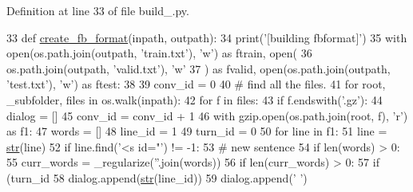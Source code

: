 Definition at line 33 of file build\+\_.\+py.


\begin{DoxyCode}
33 \textcolor{keyword}{def }\hyperlink{namespaceparlai_1_1tasks_1_1opensubtitles_1_1build__2009_ad149abe80311061e9b055102702633ed}{create\_fb\_format}(inpath, outpath):
34     print(\textcolor{stringliteral}{'[building fbformat]'})
35     with open(os.path.join(outpath, \textcolor{stringliteral}{'train.txt'}), \textcolor{stringliteral}{'w'}) \textcolor{keyword}{as} ftrain, open(
36         os.path.join(outpath, \textcolor{stringliteral}{'valid.txt'}), \textcolor{stringliteral}{'w'}
37     ) \textcolor{keyword}{as} fvalid, open(os.path.join(outpath, \textcolor{stringliteral}{'test.txt'}), \textcolor{stringliteral}{'w'}) \textcolor{keyword}{as} ftest:
38 
39         conv\_id = 0
40         \textcolor{comment}{# find all the files.}
41         \textcolor{keywordflow}{for} root, \_subfolder, files \textcolor{keywordflow}{in} os.walk(inpath):
42             \textcolor{keywordflow}{for} f \textcolor{keywordflow}{in} files:
43                 \textcolor{keywordflow}{if} f.endswith(\textcolor{stringliteral}{'.gz'}):
44                     dialog = []
45                     conv\_id = conv\_id + 1
46                     with gzip.open(os.path.join(root, f), \textcolor{stringliteral}{'r') as f1:}
47 \textcolor{stringliteral}{                        words = []}
48 \textcolor{stringliteral}{                        line\_id = 1}
49 \textcolor{stringliteral}{                        turn\_id = 0}
50 \textcolor{stringliteral}{                        }\textcolor{keywordflow}{for} line \textcolor{keywordflow}{in} f1:
51                             line = \hyperlink{namespacegenerate__task__READMEs_a5b88452ffb87b78c8c85ececebafc09f}{str}(line)
52                             \textcolor{keywordflow}{if} line.find(\textcolor{stringliteral}{'<s id="'}) != -1:
53                                 \textcolor{comment}{# new sentence}
54                                 \textcolor{keywordflow}{if} len(words) > 0:
55                                     curr\_words = \_regularize(\textcolor{stringliteral}{''}.join(words))
56                                     \textcolor{keywordflow}{if} len(curr\_words) > 0:
57                                         \textcolor{keywordflow}{if} (turn\_id %
58                                             dialog.append(\hyperlink{namespacegenerate__task__READMEs_a5b88452ffb87b78c8c85ececebafc09f}{str}(line\_id))
59                                             dialog.append(\textcolor{stringliteral}{' '})

\end{DoxyCode}

